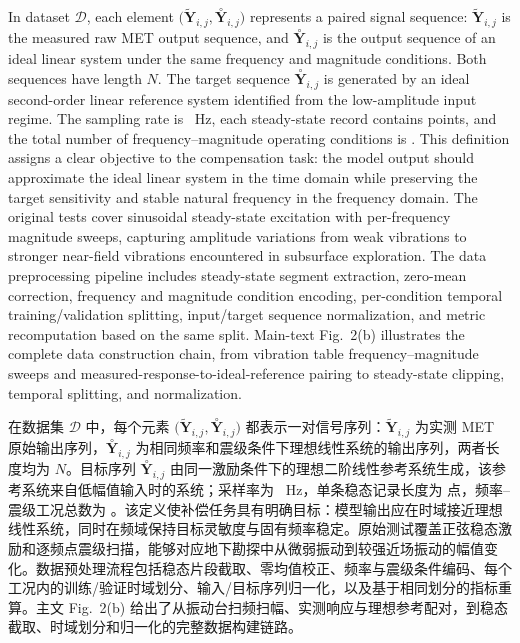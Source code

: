 \documentclass[sn-nature]{sn-jnl}
\newif\ifCNENEnglish
\newif\ifCNENBilingual
\newcommand{\CNEN}[2]{%
    \ifCNENBilingual
        #1%
        \if\relax\detokenize{#2}\relax\else\par #2\fi%
    \else
        \ifCNENEnglish
            #2%
        \else
            #1%
        \fi
    \fi
}
\newcommand{\fidx}{i} %
\newcommand{\midx}{j} %
\newcommand{\pmax}{N} %
\newcommand{\dataset}{{\mathcal{D}}} %
\newcommand{\yseq}{{\mathbf{Y}}} %
\newcommand{\ideal}[1]{\overset{\circ}{#1}} %
\newcommand{\exam}[1]{\tilde{#1}} %
\begin{document}
\CNEN{在数据集 $\dataset$ 中，每个元素 $\bigl(\exam{\yseq}_{\fidx,\midx}, \ideal{\yseq}_{\fidx,\midx}\bigr)$ 都表示一对信号序列：$\exam{\yseq}_{\fidx,\midx}$ 为实测 MET 原始输出序列，$\ideal{\yseq}_{\fidx,\midx}$ 为相同频率和震级条件下理想线性系统的输出序列，两者长度均为 $\pmax$。目标序列 $\ideal{\yseq}_{\fidx,\midx}$ 由同一激励条件下的理想二阶线性参考系统生成，该参考系统来自低幅值输入时的系统；采样率为 \valSamplingFreq~Hz，单条稳态记录长度为 \valDatasetPointsPerRecord{} 点，频率--震级工况总数为 \valDatasetOperatingPoints{}。该定义使补偿任务具有明确目标：模型输出应在时域接近理想线性系统，同时在频域保持目标灵敏度与固有频率稳定。原始测试覆盖正弦稳态激励和逐频点震级扫描，能够对应地下勘探中从微弱振动到较强近场振动的幅值变化。数据预处理流程包括稳态片段截取、零均值校正、频率与震级条件编码、每个工况内的训练/验证时域划分、输入/目标序列归一化，以及基于相同划分的指标重算。主文 Fig.~2(b) 给出了从振动台扫频扫幅、实测响应与理想参考配对，到稳态截取、时域划分和归一化的完整数据构建链路。}{In dataset $\dataset$, each element $\bigl(\exam{\yseq}_{\fidx,\midx}, \ideal{\yseq}_{\fidx,\midx}\bigr)$ represents a paired signal sequence: $\exam{\yseq}_{\fidx,\midx}$ is the measured raw MET output sequence, and $\ideal{\yseq}_{\fidx,\midx}$ is the output sequence of an ideal linear system under the same frequency and magnitude conditions. Both sequences have length $\pmax$. The target sequence $\ideal{\yseq}_{\fidx,\midx}$ is generated by an ideal second-order linear reference system identified from the low-amplitude input regime. The sampling rate is \valSamplingFreq~Hz, each steady-state record contains \valDatasetPointsPerRecord{} points, and the total number of frequency--magnitude operating conditions is \valDatasetOperatingPoints{}. This definition assigns a clear objective to the compensation task: the model output should approximate the ideal linear system in the time domain while preserving the target sensitivity and stable natural frequency in the frequency domain. The original tests cover sinusoidal steady-state excitation with per-frequency magnitude sweeps, capturing amplitude variations from weak vibrations to stronger near-field vibrations encountered in subsurface exploration. The data preprocessing pipeline includes steady-state segment extraction, zero-mean correction, frequency and magnitude condition encoding, per-condition temporal training/validation splitting, input/target sequence normalization, and metric recomputation based on the same split. Main-text Fig.~2(b) illustrates the complete data construction chain, from vibration table frequency--magnitude sweeps and measured-response-to-ideal-reference pairing to steady-state clipping, temporal splitting, and normalization.%
}
\end{document}
